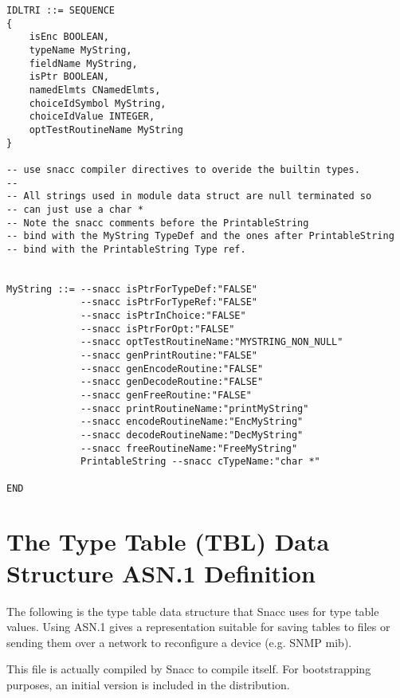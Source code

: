 \begin{small}
\begin{verbatim}
IDLTRI ::= SEQUENCE
{
    isEnc BOOLEAN,
    typeName MyString,
    fieldName MyString,
    isPtr BOOLEAN,
    namedElmts CNamedElmts,
    choiceIdSymbol MyString,
    choiceIdValue INTEGER,
    optTestRoutineName MyString
}

-- use snacc compiler directives to overide the builtin types.
--
-- All strings used in module data struct are null terminated so
-- can just use a char *
-- Note the snacc comments before the PrintableString
-- bind with the MyString TypeDef and the ones after PrintableString
-- bind with the PrintableString Type ref.


MyString ::= --snacc isPtrForTypeDef:"FALSE"
             --snacc isPtrForTypeRef:"FALSE"
             --snacc isPtrInChoice:"FALSE"
             --snacc isPtrForOpt:"FALSE"
             --snacc optTestRoutineName:"MYSTRING_NON_NULL"
             --snacc genPrintRoutine:"FALSE"
             --snacc genEncodeRoutine:"FALSE"
             --snacc genDecodeRoutine:"FALSE"
             --snacc genFreeRoutine:"FALSE"
             --snacc printRoutineName:"printMyString"
             --snacc encodeRoutineName:"EncMyString"
             --snacc decodeRoutineName:"DecMyString"
             --snacc freeRoutineName:"FreeMyString"
             PrintableString --snacc cTypeName:"char *"

END
\end{verbatim}
\end{small}


\chapter{The Type Table (TBL) Data Structure ASN.1 Definition}

The following is the type table data structure that Snacc uses for
type table values.  Using ASN.1 gives a representation suitable for
saving tables to files or sending them over a network to reconfigure a
device (e.g. SNMP mib).

This file is actually compiled by Snacc to compile itself.
For bootstrapping purposes, an initial version is included in the distribution.

